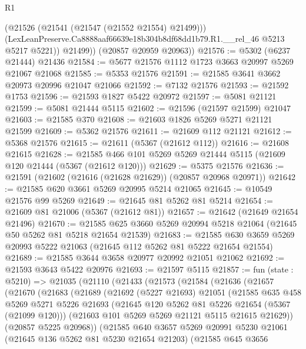 \begin{lexlean}{R1}
\begin{coremodule}
            (@21526 (@21541 (@21547 (@21552 @21554) @21499)))
            (LexLeanPreserve.Ca8888aaf66639e18b304b8df68dd1b79.R1.__rel_46 @5213 @5217 @5221))
          @21499))
      (@20857 @20959 @20963))
@21576 := @5302 (@6237 @21444) @21436
@21584 := @5677 @21576 @1112 @1723 @3663 @20997 @5269 @21067 @21068
@21585 := @5353 @21576
@21591 := @21585 @3641 @3662 @20973 @20996 @21047 @21066
@21592 := @7132 @21576
@21593 := @21592 @1753
@21596 := @21593 @1827 @5422 @20972
@21597 := @5081 @21121
@21599 := @5081 @21444 @5115
@21602 := @21596 (@21597 @21599) @21047
@21603 := @21585 @370
@21608 := @21603 @1826 @5269 @5271 @21121 @21599
@21609 := @5362 @21576
@21611 := @21609 @112 @21121
@21612 := @5368 @21576
@21615 := @21611 (@5367 (@21612 @112))
@21616 := @21608 @21615
@21628 := @21585 @466 @101 @5269 @5269 @21444 @5115 (@21609 @120 @21444 (@5367 (@21612 @120)))
@21629 := @5375 @21576
@21636 := @21591 (@21602 (@21616 (@21628 @21629)) (@20857 @20968 @20971))
@21642 := @21585 @620 @3661 @5269 @20995 @5214 @21065
@21645 := @10549 @21576 @99 @5269
@21649 := @21645 @81 @5262 @81 @5214
@21654 := @21609 @81 @21006 (@5367 (@21612 @81))
@21657 := @21642 (@21649 @21654 @21496)
@21670 := @21585 @625 @3660 @5269 @20994 @5218 @21064 (@21645 @50 @5262 @81 @5218 @21654 @21539)
@21683 := @21585 @630 @3659 @5269 @20993 @5222 @21063 (@21645 @112 @5262 @81 @5222 @21654 @21554)
@21689 := @21585 @3644 @3658 @20977 @20992 @21051 @21062
@21692 := @21593 @3643 @5422 @20976
@21693 := @21597 @5115
@21857 := fun (state : @5210) =>
  @21035
    (@21110
      (@21433
        (@21573
          (@21584
            (@21636
              (@21657
                (@21670
                  (@21683
                    (@21689
                      (@21692
                        (@5227 @21693)
                        @21051
                        (@21585
                          @635
                          @458
                          @5269
                          @5271
                          @5226
                          @21693
                          (@21645 @120 @5262 @81 @5226 @21654 (@5367 (@21099 @120)))
                          (@21603 @101 @5269 @5269 @21121 @5115 @21615 @21629))
                        (@20857 @5225 @20968))
                      (@21585
                        @640
                        @3657
                        @5269
                        @20991
                        @5230
                        @21061
                        (@21645 @136 @5262 @81 @5230 @21654 @21203)
                        (@21585
                          @645
                          @3656

\end{coremodule}
\end{lexlean}
